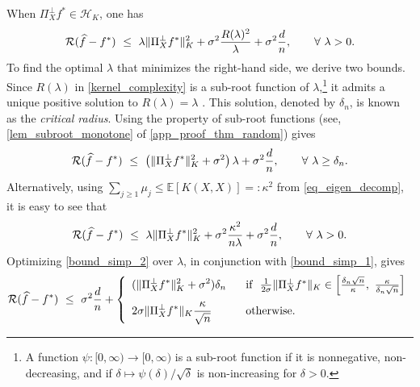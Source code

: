 \documentclass[11pt,twoside]{article}
\def\EE{\mathbb{E}}
\def\cH{\mathcal H}
\def\cR{\mathcal R}
\def\wh{\widehat}
\def\i{\infty}
\def\l{\left}
\def\r{\right}
\begin{document}
\begin{remark}\label{rem_correct}
When $\Pi_X^\perp f^* \in \cH_K$,  one has 
\[
    \cR(\wh f-f^*) ~ \le~     \lambda \|\Pi_X^\perp f^*\|_K^2  + \sigma^2 \frac{R(\lambda)^2}{\lambda} + \sigma^2  {d\over n},\qquad \forall~  \lambda >0.
\]
To find the optimal $\lambda$ that minimizes the right-hand side, we derive two bounds. Since $R(\lambda)$ in \eqref{kernel_complexity} is a sub-root function of $\lambda$,\footnote{A function $\psi: [0,\i)\to  [0,\i)$ is a sub-root function if it is nonnegative, non-decreasing, and if $\delta\mapsto \psi(\delta)/\sqrt{\delta}$ is non-increasing for $\delta>0$.} it admits a unique positive solution to $R(\lambda)=\lambda$ \citep[Lemma 3.2]{bartlett2005local}. This solution, denoted by $\delta_n$, is known as the {\em critical radius}. Using the property of sub-root functions (see, \cref{lem_subroot_monotone} of  \cref{app_proof_thm_random})  gives
\begin{equation}\label{bound_simp_1}
    \cR(\wh f-f^*) ~ \le~     \left( \|\Pi_X^\perp f^*\|_K^2  + \sigma^2 \right) \lambda  + \sigma^2  {d\over n},\qquad \forall ~ \lambda \ge \delta_n.
\end{equation}
Alternatively, using $\sum_{j\ge 1} \mu_j \le \EE[K(X,X)]  =: \kappa^2$ from \eqref{eq_eigen_decomp}, it is easy to see that 
\begin{equation}\label{bound_simp_2}
    \cR(\wh f-f^*) ~ \le~      \lambda \|\Pi_X^\perp f^*\|_K^2  + \sigma^2 {\kappa^2 \over n\lambda} + \sigma^2  {d\over n},\qquad \forall~  \lambda >0.
\end{equation}
Optimizing \eqref{bound_simp_2} over $\lambda$, in conjunction with  \eqref{bound_simp_1}, gives 
\begin{equation}\label{bound_simp}
     \cR(\wh f-f^*) ~ \le~  \sigma^2  {d\over n}  +   \l\{\begin{array}{ll}
          \displaystyle  ( \|\Pi_X^\perp f^*\|_K^2  + \sigma^2 )\delta_n   &   \text{if}~~    {1 \over 2\sigma}\|\Pi_X^\perp f^*\|_K \in \l[{\delta_n\sqrt{n}\over \kappa}, ~ {\kappa\over \delta_n\sqrt n}\r]\vspace{2mm}\\
        \displaystyle 2\sigma \|\Pi_X^\perp f^*\|_K  {\kappa \over \sqrt n} \qquad &  \text{otherwise.}
     \end{array}\r.  
\end{equation}

\end{remark}
\end{document}
